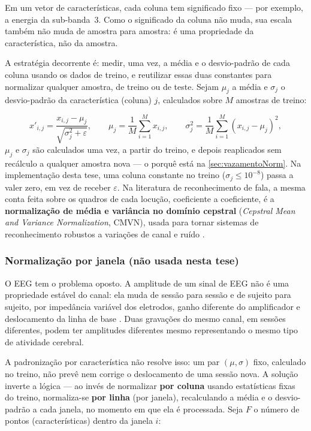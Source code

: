 				\par Em um vetor de características, cada coluna tem significado fixo --- por exemplo, a energia da sub-banda~3. Como o significado da coluna não muda, sua escala também não muda de amostra para amostra: é uma propriedade da característica, não da amostra.

				\par A estratégia decorrente é: medir, uma vez, a média e o desvio-padrão de cada coluna usando os dados de treino, e reutilizar essas duas constantes para normalizar qualquer amostra, de treino ou de teste. Sejam $\mu_j$ a média e $\sigma_j$ o desvio-padrão da característica (coluna) $j$, calculados sobre $M$ amostras de treino:

				\begin{equation}
					\label{eq:normAudio}
					x'_{i,j} = \frac{x_{i,j}-\mu_j}{\sqrt{\sigma_j^2+\varepsilon}}, \qquad
					\mu_j = \frac{1}{M}\sum_{i=1}^{M} x_{i,j}, \qquad
					\sigma_j^2 = \frac{1}{M}\sum_{i=1}^{M}(x_{i,j}-\mu_j)^2,
				\end{equation}
				$\mu_j$ e $\sigma_j$ são calculados uma vez, a partir do treino, e depois reaplicados sem recálculo a qualquer amostra nova --- o porquê está na \autoref{sec:vazamentoNorm}. Na implementação desta tese, uma coluna constante no treino ($\sigma_j \leq 10^{-8}$) passa a valer zero, em vez de receber $\varepsilon$. Na literatura de reconhecimento de fala, a mesma conta feita sobre os quadros de cada locução, coeficiente a coeficiente, é a \textbf{normalização de média e variância no domínio cepstral} (\textit{Cepstral Mean and Variance Normalization}, CMVN), usada para tornar sistemas de reconhecimento robustos a variações de canal e ruído \cite{viikki1998cepstral}.

			\subsubsection{Normalização por janela (não usada nesta tese)}

				\par O EEG tem o problema oposto. A amplitude de um sinal de EEG não é uma propriedade estável do canal: ela muda de sessão para sessão e de sujeito para sujeito, por impedância variável dos eletrodos, ganho diferente do amplificador e deslocamento da linha de base \cite{lotte2018review}. Duas gravações do mesmo canal, em sessões diferentes, podem ter amplitudes diferentes mesmo representando o mesmo tipo de atividade cerebral.

				\par A padronização por característica não resolve isso: um par $(\mu,\sigma)$ fixo, calculado no treino, não prevê nem corrige o deslocamento de uma sessão nova. A solução inverte a lógica --- ao invés de normalizar \textbf{por coluna} usando estatísticas fixas do treino, normaliza-se \textbf{por linha} (por janela), recalculando a média e o desvio-padrão a cada janela, no momento em que ela é processada. Seja $F$ o número de pontos (características) dentro da janela $i$:

